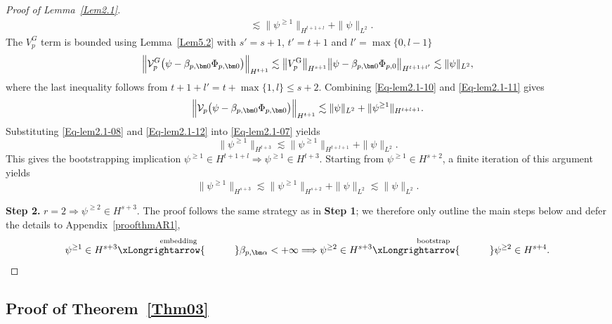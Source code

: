 \documentclass{sn-jnl}%
\newcommand{\bnm}[1]{\bigl\| #1 \bigr\|}
\numberwithin{equation}{section}
\theoremstyle{thmstyleone}%
\theoremstyle{thmstyletwo}%
\theoremstyle{thmstylethree}%
\begin{document}
\begin{proof}[Proof of Lemma~\ref{Lem2.1}]
\begin{equation}
\begin{aligned}
        &\lesssim 
        \|\psi^{\ge 1}\|_{H^{t+1+l}} + \|\psi\|_{L^2}.
    \end{aligned}
    \end{equation}
    The $V^{G}_p$ term is bounded using Lemma~\ref{Lem5.2} with $s' = s+1$, $t'=t+1$ and $l' = \max\{0,l-1\}$
    \begin{equation}\label{Eq-lem2.1-11}
        \Bigl\|\mathcal{V}_p^{G}\bigl(\psi-\beta_{p,\bm 0}\Phi_{p,\bm 0}\bigr)\Bigr\|_{H^{t+1}}
        \lesssim \bnm{V_{p}^{\mathrm{G}}}_{H^{s+1}}\bnm{\psi-\beta_{p,\bm 0}\Phi_{p,0}}_{H^{t+1+l'}}\lesssim \|\psi\|_{L^2},
    \end{equation}
    where the last inequality follows from $t+1+l' = t+\max\{1,l\}\leq s+2$. Combining \eqref{Eq-lem2.1-10} and \eqref{Eq-lem2.1-11} gives
   \begin{equation}\label{Eq-lem2.1-12}  
        \Bigl\|\mathcal{V}_p\bigl(\psi-\beta_{p,\bm 0}\Phi_{p,\bm 0}\bigr)\Bigr\|_{H^{t+1}}
        \lesssim\|\psi\|_{L^2}+\|\psi^{\geq 1}\|_{H^{t+l+1}}.
    \end{equation}
    Substituting \eqref{Eq-lem2.1-08} and \eqref{Eq-lem2.1-12} into \eqref{Eq-lem2.1-07} yields
    \begin{equation}
        \|\psi^{\geq 1}\|_{H^{t+3}} \lesssim \|\psi^{\geq 1}\|_{H^{t+l+1}} + \|\psi\|_{L^2}.
    \end{equation}
    This gives the bootstrapping implication 
    $
        \psi^{\geq 1} \in H^{t+1+l} \Longrightarrow \psi^{\geq 1} \in H^{t+3}.
    $
    Starting from $\psi^{\geq 1}\in H^{s+2}$, a finite iteration of this argument yields
    \begin{equation}
        \|\psi^{\geq 1}\|_{H^{s+3}} \lesssim  \|\psi^{\geq 1}\|_{H^{s+2}}+\|\psi\|_{L^2}\lesssim
        \|\psi\|_{L^2}.
    \end{equation}
   
   \textbf{Step 2.} $r=2\Rightarrow \psi^{\geq 2}\in H^{s+3}$. 
    The proof follows the same strategy as in \textbf{Step 1}; we therefore only outline the main steps below and defer the details to Appendix~\ref{proofthmAR1},
    \[
    \psi^{\ge 1} \in H^{s+3} 
    \overset{\mathrm{embedding}}{\xLongrightarrow{\qquad\quad}}
    \beta_{p,\bm \alpha}<+\infty \Longrightarrow\psi^{\ge 2}\in H^{s+3} 
    \overset{\mathrm{bootstrap}}{\xLongrightarrow{\qquad\quad}}
    \psi^{\ge 2} \in H^{s+4}.
    \]
\end{proof}

\subsection{Proof of \texorpdfstring{Theorem~\ref{Thm03}}{Theorem Y}} 
\label{subsec:AR4}
\end{document}

